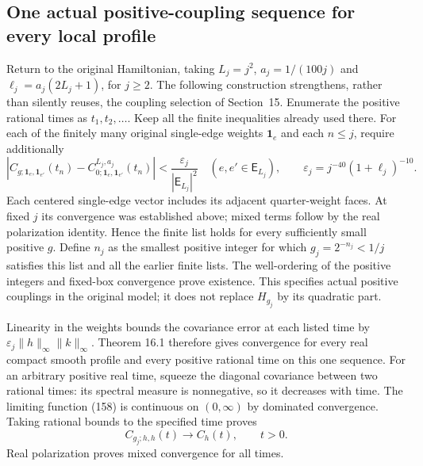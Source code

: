 \documentclass[11pt]{article}
\begin{document}
\subsection{One actual positive-coupling sequence for every local profile}

Return to the original Hamiltonian, taking
$L_j=j^2$, $a_j=1/(100j)$ and $\ell_j=a_j(2L_j+1)$, for $j\ge2$.
The following construction strengthens, rather than silently reuses,
the coupling selection of Section~15. Enumerate the positive rational
times as $t_1,t_2,\ldots$. Keep all the finite inequalities already
used there. For each of the finitely many original single-edge
weights $\mathbf1_e$ and each $n\le j$, require additionally
\begin{equation}\label{eq:full-diagonal-selection}
 \left|C_{g;\mathbf1_e,\mathbf1_{e'}}(t_n)
       -C_{0;\mathbf1_e,\mathbf1_{e'}}^{L_j,a_j}(t_n)\right|
       <\frac{\varepsilon_j}{|\mathsf E_{L_j}|^2}
 \quad(e,e'\in\mathsf E_{L_j}),\qquad
 \varepsilon_j=j^{-40}(1+\ell_j)^{-10}.
\end{equation}
Each centered single-edge vector includes its adjacent quarter-weight
faces. At fixed $j$ its convergence was established above; mixed
terms follow by the real polarization identity. Hence the finite
list holds for every sufficiently small positive $g$. Define $n_j$
as the smallest positive integer for which $g_j=2^{-n_j}<1/j$
satisfies this list and all the earlier finite lists. The well-ordering
of the positive integers and fixed-box convergence prove existence.
This specifies actual positive couplings in the original model;
it does not replace $H_{g_j}$ by its quadratic part.

Linearity in the weights bounds the covariance error at each listed
time by $\varepsilon_j\|h\|_\infty\|k\|_\infty$. Theorem
16.1 therefore gives convergence for
every real compact smooth profile and every positive rational time
on this one sequence. For an arbitrary positive real time, squeeze
the diagonal covariance between two rational times: its spectral
measure is nonnegative, so it decreases with time. The limiting
function (158) is continuous on $(0,\infty)$
by dominated convergence. Taking rational bounds to the specified
time proves
\begin{equation}\label{eq:full-actual-convergence}
 C_{g_j;h,h}(t)\longrightarrow C_h(t),\qquad t>0.
\end{equation}
Real polarization proves mixed convergence for all times.
\end{document}
